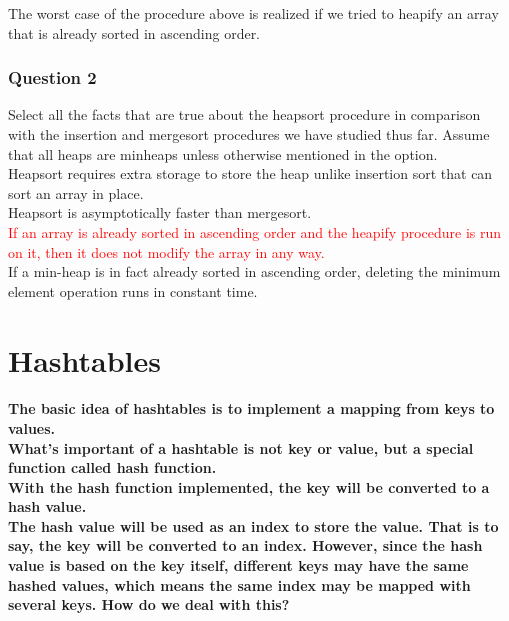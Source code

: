 \documentclass{article}
\begin{document}
The  worst case of the procedure above is realized if we tried to heapify an array that is already sorted in ascending order.\\

\subsubsection{Question 2}

Select all the facts that are true about the heapsort procedure in comparison with the insertion and mergesort procedures we have studied thus far. 
Assume that all heaps are minheaps unless otherwise mentioned in the option.\\

Heapsort requires extra storage to store the heap unlike insertion sort that can sort an array in place.\\

Heapsort is asymptotically faster than mergesort.\\

\textcolor{red}{If an array is already sorted in ascending order and the heapify procedure is run on it, then it does not modify the array in any way.} \\

If a min-heap is in fact already sorted in ascending order, deleting the minimum element operation runs in constant time.\\



\section{Hashtables}

\paragraph{The basic idea of hashtables is to implement a mapping from keys to values.\\
What's important of a hashtable is not key or value, but a special function called hash function.\\
With the hash function implemented, the key will be converted to a hash value.\\
The hash value will be used as an index to store the value. That is to say, the key will be converted to an index. However, since the hash value is based on the key itself,
different keys may have the same hashed values, which means the same index may be mapped with several keys. How do we deal with this?\\}
\end{document}
